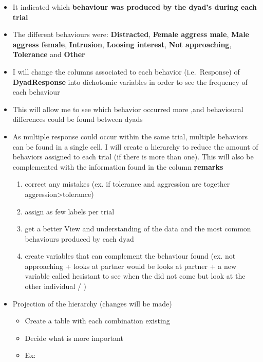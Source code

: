\documentclass[
]{article}
\providecommand{\tightlist}{%
  \setlength{\itemsep}{0pt}\setlength{\parskip}{0pt}}
\begin{document}
\begin{itemize}
  \begin{itemize}
  \tightlist
  \item
    It indicated which \textbf{behaviour was produced by the dyad's
    during each trial}
  \item
    The different behaviours were: \textbf{Distracted}, \textbf{Female
    aggress male}, \textbf{Male aggress female}, \textbf{Intrusion},
    \textbf{Loosing interest}, \textbf{Not approaching},
    \textbf{Tolerance} and \textbf{Other}
  \item
    I will change the columns associated to each behavior
    (i.e.~Response) of \textbf{DyadResponse} into dichotomic variables
    in order to see the frequency of each behaviour
  \item
    This will allow me to see which behavior occurred more ,and
    behavioural differences could be found between dyads
  \item
    As multiple response could occur within the same trial, multiple
    behaviors can be found in a single cell. I will create a hierarchy
    to reduce the amount of behaviors assigned to each trial (if there
    is more than one). This will also be complemented with the
    information found in the column \textbf{remarks}

    \begin{enumerate}
    \def\labelenumi{\arabic{enumi}.}
    \tightlist
    \item
      correct any mistakes (ex. if tolerance and aggression are together
      aggression\textgreater tolerance)
    \item
      assign as few labels per trial
    \item
      get a better View and understanding of the data and the most
      common behaviours produced by each dyad
    \item
      create variables that can complement the behaviour found (ex. not
      approaching + looks at partner would be looks at partner + a new
      variable called hesistant to see when the did not come but look at
      the other individual / )
    \end{enumerate}
  \item
    Projection of the hierarchy (changes will be made)

    \begin{itemize}
    \item
      Create a table with each combination existing
    \item
      Decide what is more important
    \item
      Ex:


\end{itemize}
\end{itemize}
\end{itemize}
\end{document}
